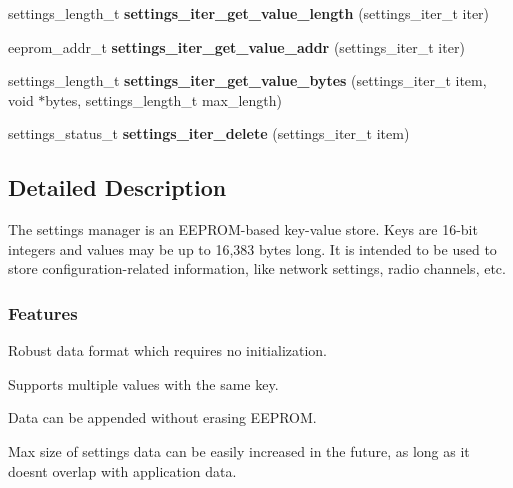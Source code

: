 \begin{DoxyCompactItemize}
\item 
\hypertarget{group__settings__lib_ga6501f07db00484c398e699dd0f578480}{}settings\+\_\+length\+\_\+t {\bfseries settings\+\_\+iter\+\_\+get\+\_\+value\+\_\+length} (settings\+\_\+iter\+\_\+t iter)\label{group__settings__lib_ga6501f07db00484c398e699dd0f578480}

\item 
\hypertarget{group__settings__lib_gaffec033c8572f024bcbba472d7ebf716}{}eeprom\+\_\+addr\+\_\+t {\bfseries settings\+\_\+iter\+\_\+get\+\_\+value\+\_\+addr} (settings\+\_\+iter\+\_\+t iter)\label{group__settings__lib_gaffec033c8572f024bcbba472d7ebf716}

\item 
\hypertarget{group__settings__lib_gad0b19321b7ecccb7d7d1ff1c68336f51}{}settings\+\_\+length\+\_\+t {\bfseries settings\+\_\+iter\+\_\+get\+\_\+value\+\_\+bytes} (settings\+\_\+iter\+\_\+t item, void $\ast$bytes, settings\+\_\+length\+\_\+t max\+\_\+length)\label{group__settings__lib_gad0b19321b7ecccb7d7d1ff1c68336f51}

\item 
\hypertarget{group__settings__lib_ga18b13b47aaf086c05667d004a4760736}{}settings\+\_\+status\+\_\+t {\bfseries settings\+\_\+iter\+\_\+delete} (settings\+\_\+iter\+\_\+t item)\label{group__settings__lib_ga18b13b47aaf086c05667d004a4760736}

\end{DoxyCompactItemize}


\subsection{Detailed Description}
The settings manager is an E\+E\+P\+R\+O\+M-\/based key-\/value store. Keys are 16-\/bit integers and values may be up to 16,383 bytes long. It is intended to be used to store configuration-\/related information, like network settings, radio channels, etc.

\subsubsection*{Features}


\begin{DoxyItemize}
\item Robust data format which requires no initialization.
\item Supports multiple values with the same key.
\item Data can be appended without erasing E\+E\+P\+R\+O\+M.
\item Max size of settings data can be easily increased in the future, as long as it doesn\textquotesingle{}t overlap with application data.
\end{DoxyItemize}

